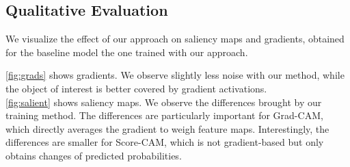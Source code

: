 \subsection{Qualitative Evaluation}
We visualize the effect of our approach on saliency maps and gradients, obtained for the baseline 
model \vs the one trained with our approach.


\noindent \autoref{fig:grads} shows gradients. We observe slightly less noise with our method, while 
the object of interest is better covered by gradient activations.\\



\noindent \autoref{fig:salient} shows saliency maps. We observe the differences brought by our 
training method. The differences are particularly important for Grad-CAM, which directly averages 
the gradient to weigh feature maps. Interestingly, the differences are smaller for Score-CAM, which 
is not gradient-based but only obtains changes of predicted probabilities.


